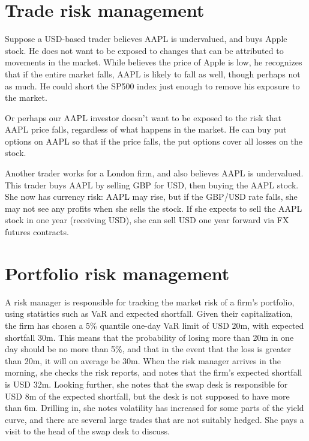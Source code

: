 \documentclass{report}
\numberwithin{problem}{chapter} %
\begin{document}
\section{Trade risk management}

Suppose a USD-based trader believes AAPL is undervalued, and buys Apple stock.  He does not want to be exposed to changes that can be attributed to movements in the market. While believes the price of Apple is low, he recognizes that if the entire market falls, AAPL is likely to fall as well, though perhaps not as much. He could \gls{short} the SP500 index just enough to remove his exposure to the market. 

Or perhaps our AAPL investor doesn't want to be exposed to the risk that AAPL price falls, regardless of what happens in the market. He can buy put options on AAPL so that if the price falls, the put options cover all losses on the stock. 

Another trader works for a London firm, and also believes AAPL is undervalued. This trader buys AAPL by selling GBP for USD, then buying the AAPL stock. She now has currency risk: AAPL may rise, but if the GBP/USD rate falls, she may not see any profits when she sells the stock. If she expects to sell the AAPL stock in one year (receiving USD), she can sell USD one year forward via FX futures contracts. 

\section{Portfolio risk management}

A risk manager is responsible for tracking the \gls{market risk} of a firm's portfolio, using statistics such as \gls{VaR} and \gls{expected shortfall}. Given their capitalization, the firm has chosen a 5\% quantile one-day VaR limit of USD 20m, with expected shortfall 30m. This means that the probability of losing more than 20m in one day should be no more than 5\%, and that in the event that the loss is greater than 20m, it will on average be 30m. When the risk manager arrives in the morning, she checks the risk reports, and notes that the firm's expected shortfall is USD 32m. Looking further, she notes that the swap desk is responsible for USD 8m of the expected shortfall, but the desk is not supposed to have more than 6m. Drilling in, she notes volatility has increased for some parts of the yield curve, and there are several large trades that are not suitably hedged. She pays a visit to the head of the swap desk to discuss. 
\end{document}
